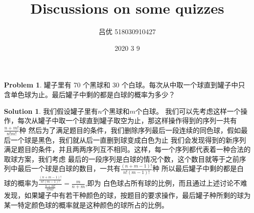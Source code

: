 \documentclass[UTF8]{ctexart}
\theoremstyle{definition}
\newtheorem{problem}{Problem}
\newtheorem{solution}{Solution}
\begin{document}
\title{Discussions on some quizzes}
\author{吕优 518030910427}
\date{2020 3 9}

\maketitle

\begin{problem}
    罐子里有 70 个黑球和 30 个白球。每次从中取一个球直到罐子中只含单色球为止。最后罐子中剩的都是白球的概率为多少？
\end{problem}

\begin{solution}
    我们假设罐子里有$n$个黑球和$m$个白球。
    我们可以先考虑这样一个操作，每次从罐子中取一个球直到罐子取空为止，那这样操作得到的序列一共有$\frac{n+m!}{n!m!}$种
    然后为了满足题目的条件，我们删除序列最后一段连续的同色球，假如最后一个球是黑色，我们就从后一直删到球变成白色为止
    我们会发现得到的新序列满足题目的条件，并且两两序列互不相同。这样，每一个序列都代表着一种合法的取球方案，我们考虑
    最后的一段序列是白球的情况个数，这个数目就等于之前序列中最后一个球是白球的数目，一共有$\frac{(n+m-1)!}{n!(m-1)!}$种
    所以最后罐子中剩的都是白球的概率为$\frac{\frac{(n+m-1)!}{n!(m-1)!}}{\frac{n+m!}{n!m!}}=\frac{m}{n+m}$,即为
    白色球占所有球的比例，而且通过上述讨论不难发现，如果罐子中有若干种颜色的球，按题目的要求操作，最后罐子种所剩的球为
    某一特定颜色球的概率就是这种颜色的球所占的比例。
\end{solution}
\end{document}
